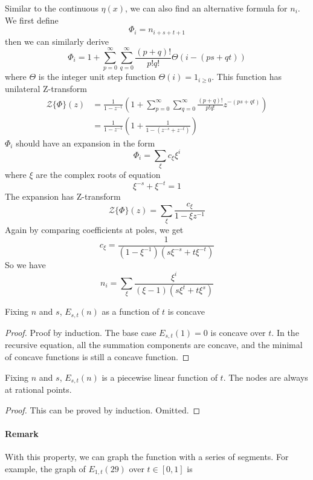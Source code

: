 \documentclass[]{article}
\begin{document}
Similar to the continuous $\eta(x)$, we can also find an alternative formula for $n_i$. We first define 
\[
\Phi_i = n_{i+s+t+1}
\]
then we can similarly derive
\[
\Phi_i = 1 + \sum_{p=0}^{\infty} \sum_{q=0}^{\infty}\frac{(p+q)!}{p!q!} \Theta(i-(ps+qt))
\]
where $\Theta$ is the integer unit step function $\Theta(i) = 1_{i \geq 0}$. This function has unilateral Z-transform
\begin{align*}
\mathcal{Z}\{\Phi\}(z) &= \frac{1}{1-z^{-1}}\left(1 +  \sum_{p=0}^{\infty} \sum_{q=0}^{\infty}\frac{(p+q)!}{p!q!} z^{-(ps+qt)} \right) \\
&= \frac{1}{1-z^{-1}}\left(1 +  \frac{1}{1-(z^{-s} + z^{-t})} \right)
\end{align*}
$\Phi_i$ should have an expansion in the form
\[
\Phi_i = \sum_{\xi} c_{\xi}\xi^i
\]
where $\xi$ are the complex roots of equation
\[
\xi^{-s} + \xi^{-t} = 1
\]
The expansion has Z-transform
\[
\mathcal{Z}\{\Phi\}(z) = \sum_{\xi} \frac{c_{\xi}}{1-\xi z^{-1}}
\]
Again by comparing coefficients at poles, we get
\[
c_{\xi} = \frac{1}{(1-\xi^{-1})(s\xi^{-s}+t\xi^{-t})}
\]
So we have
\[
n_i = \sum_{\xi} \frac{\xi^{i}}{(\xi - 1)(s\xi^{t}+t\xi^{s})}
\]

\vspace{1cm}
\begin{lemma}[$s,t$-concavity]
Fixing $n$ and $s$, $E_{s,t}(n)$ as a function of $t$ is concave 
\end{lemma}
\begin{proof}
Proof by induction. The base case $E_{s,t}(1) = 0$ is concave over $t$. In the recursive equation, all the summation components are concave, and the minimal of concave functions is still a concave function.
\end{proof}

\vspace{1cm}
\begin{lemma}[$s,t$-linearity]
Fixing $n$ and $s$, $E_{s,t}(n)$ is a piecewise linear function of $t$. The nodes are always at rational points.
\end{lemma}
\begin{proof}
	This can be proved by induction. Omitted.
\end{proof}

\paragraph{Remark}
With this property, we can graph the function with a series of segments. For example, the graph of $E_{1,t}(29)$ over $t\in[0,1]$ is 
\end{document}
